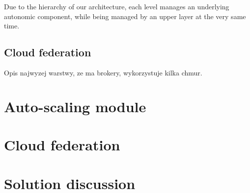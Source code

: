 Due to the hierarchy of our architecture, each level manages an underlying autonomic component, while being managed by an upper layer at the very same time.



\subsection{Cloud federation}
Opis najwyzej warstwy, ze ma brokery, wykorzystuje kilka chmur.


\section{Auto-scaling module}

\section{Cloud federation}

\section{Solution discussion}
